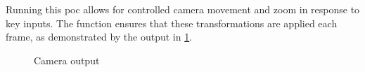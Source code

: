 \documentclass{projdoc}
\begin{document}
Running this \gls{poc} allows for controlled camera movement and zoom in response to
key inputs. The  function ensures that these
transformations are applied each frame, as demonstrated by the output in
\cref{fig:poc-output-camera}.

\begin{figure}
	\centering
	\caption{Camera  output}
	\label{fig:poc-output-camera}
\end{figure}
\end{document}
